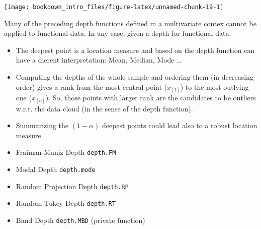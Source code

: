 \documentclass[
]{book}
\newenvironment{Shaded}{\begin{snugshade}}{\end{snugshade}}
\newcommand{\AttributeTok}[1]{\textcolor[rgb]{0.77,0.63,0.00}{#1}}
\newcommand{\DecValTok}[1]{\textcolor[rgb]{0.00,0.00,0.81}{#1}}
\newcommand{\FunctionTok}[1]{\textcolor[rgb]{0.00,0.00,0.00}{#1}}
\newcommand{\NormalTok}[1]{#1}
\newcommand{\OtherTok}[1]{\textcolor[rgb]{0.56,0.35,0.01}{#1}}
\newcommand{\SpecialCharTok}[1]{\textcolor[rgb]{0.00,0.00,0.00}{#1}}
\begin{document}
\begin{Shaded}
\end{Shaded}

\begin{center}\texttt{[image: bookdown\_intro\_files/figure-latex/unnamed-chunk-19-1]} \end{center}

Many of the preceding depth functions defined in a multivariate contex cannot be applied to functional data. In any case, given a depth for functional data.

\begin{itemize}
\item
  The deepest point is a location measure and based on the depth function can have a dierent interpretation: Mean, Median, Mode \ldots{}
\item
  Computing the depths of the whole sample and ordering them (in decreasing order) gives a rank from the most central point (\(x_{[1]}\)) to the most outlying one (\(x_{[n]}\)). So, those points with larger rank are the candidates to be outliers w.r.t. the data cloud (in the sense of the depth function).
\item
  Summarizing the \((1-\alpha)\) deepest points could lead also to a robust location measure.
\item
  Fraiman-Muniz Depth \citep{FM2001} \texttt{depth.FM}
\item
  Modal Depth \citep{Cuevas2007} \texttt{depth.mode}
\item
  Random Projection Depth \citep{Cuevas2007} \texttt{depth.RP}
\item
  Random Tukey Depth \citep{Cuesta2008} \texttt{depth.RT}\\
\item
  Band Depth \citep{Lopez2009} \texttt{depth.MBD} (private function)
\end{itemize}
\end{document}
